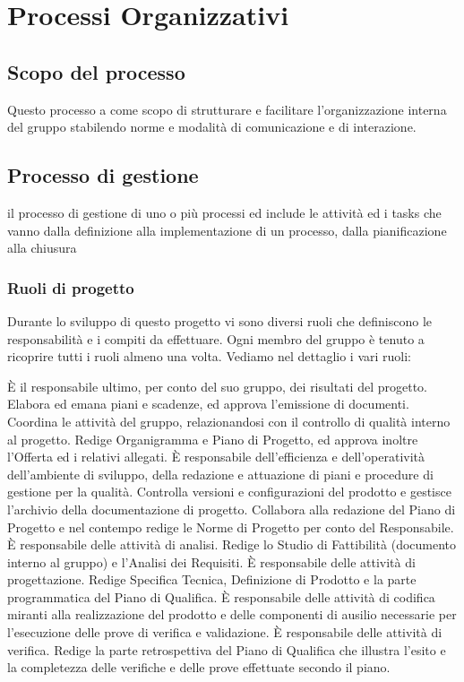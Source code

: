 \documentclass[a4paper,11pt]{article}
\begin{document}
	\section{Processi Organizzativi}
		\subsection{Scopo del processo}
		Questo processo a come scopo di strutturare e facilitare l'organizzazione interna del gruppo stabilendo norme e modalità di comunicazione e di interazione.
		
		\subsection{Processo di gestione}
		il processo di gestione di uno o più processi ed include le
attività ed i tasks che vanno dalla definizione alla
implementazione di un processo, dalla pianificazione alla
chiusura
		\subsubsection{Ruoli di progetto}
		Durante lo sviluppo di questo progetto vi sono diversi ruoli che  definiscono le responsabilità e i compiti da effettuare. Ogni membro del gruppo è tenuto a ricoprire tutti i ruoli almeno una volta. Vediamo nel dettaglio i vari ruoli:
		
		È il responsabile ultimo, per conto del suo gruppo, dei risultati del progetto.
Elabora ed emana piani e scadenze, ed approva l'emissione di documenti. 
Coordina le attività del gruppo, relazionandosi con il controllo di qualità interno al progetto. 
Redige Organigramma e Piano di Progetto, ed approva inoltre l'Offerta ed i relativi allegati.
			È responsabile dell'efficienza e dell'operatività dell'ambiente di sviluppo, della redazione e attuazione di piani e procedure di gestione per la qualità.
Controlla versioni e configurazioni del prodotto e gestisce l'archivio della documentazione di progetto. 
Collabora alla redazione del Piano di Progetto e nel contempo redige le Norme di Progetto per conto del Responsabile.
			È responsabile delle attività di analisi. 
Redige lo Studio di Fattibilità (documento interno al gruppo) e l'Analisi dei Requisiti.
			È responsabile delle attività di progettazione. 
Redige Specifica Tecnica, Definizione di Prodotto e la parte programmatica del Piano di Qualifica.
			È responsabile delle attività di codifica miranti alla realizzazione del prodotto e delle componenti di ausilio necessarie per l'esecuzione delle prove di verifica e validazione.
			È responsabile delle attività di verifica.
Redige la parte retrospettiva del Piano di Qualifica che illustra l'esito e la completezza delle verifiche e delle prove effettuate secondo il piano.
		
\end{document}
